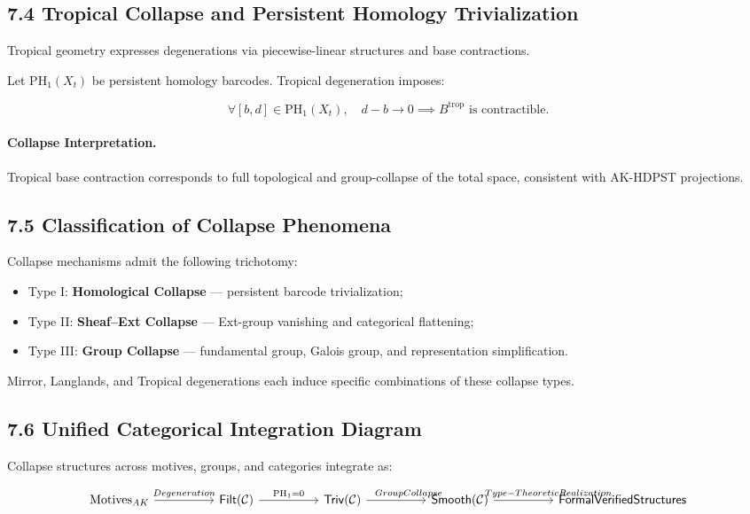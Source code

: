 \documentclass[11pt]{article}
\begin{document}
\subsection*{7.4 Tropical Collapse and Persistent Homology Trivialization}

Tropical geometry expresses degenerations via piecewise-linear structures and base contractions.

Let \( \mathrm{PH}_1(X_t) \) be persistent homology barcodes. Tropical degeneration imposes:

\[
\forall [b,d] \in \mathrm{PH}_1(X_t), \quad d - b \to 0 \implies B^{\mathrm{trop}} \text{ is contractible}.
\]

\paragraph{Collapse Interpretation.}
Tropical base contraction corresponds to full topological and group-collapse of the total space, consistent with AK-HDPST projections.

\subsection*{7.5 Classification of Collapse Phenomena}

Collapse mechanisms admit the following trichotomy:

\begin{itemize}
    \item Type I: \textbf{Homological Collapse} — persistent barcode trivialization;
    \item Type II: \textbf{Sheaf–Ext Collapse} — Ext-group vanishing and categorical flattening;
    \item Type III: \textbf{Group Collapse} — fundamental group, Galois group, and representation simplification.
\end{itemize}

Mirror, Langlands, and Tropical degenerations each induce specific combinations of these collapse types.

\subsection*{7.6 Unified Categorical Integration Diagram}

Collapse structures across motives, groups, and categories integrate as:

\[
\begin{tikzcd}[column sep=huge]
\mathrm{Motives}_{AK} \arrow[r, "Degeneration"]
& \mathsf{Filt}(\mathcal{C}) \arrow[r, "\mathrm{PH}_1 = 0"]
& \mathsf{Triv}(\mathcal{C}) \arrow[r, "\hspace{2em}Group Collapse"]
& \mathsf{Smooth}(\mathcal{C}) \arrow[r, "\hspace{4em}Type-Theoretic Realization"]
& \mathsf{Formal Verified Structures}
\end{tikzcd}
\]
\end{document}
